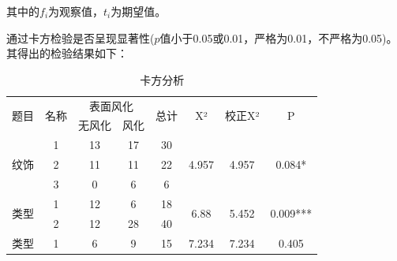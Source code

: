 \documentclass[UTF8]{ctexart}
\begin{document}
                其中的$f_i$为观察值，$t_i$为期望值。

                通过卡方检验是否呈现显著性($p$值小于0.05或0.01，严格为0.01，不严格为0.05)。其得出的检验结果如下：

                \begin{table}[H]
                    \centering
                    \caption{卡方分析}%
                    \begin{tabular}{|c|c|c|c|c|c|c|c|} \hline
                        \multirow{2}{*}{题目} & \multirow{2}{*}{名称} & \multicolumn{2}{|c|}{表面风化} & \multirow{2}{*}{总计} & \multirow{2}{*}{X²} & \multirow{2}{*}{校正X²} & \multirow{2}{*}{P}                                 \\ \cline{3-4}
                                              &                       & 无风化                         & 风化                  &                     &                         &                        &                           \\ \hline
                        \multirow{3}{*}{纹饰} & 1                     & 13                             & 17                    & 30                  & \multirow{3}{*}{4.957}  & \multirow{3}{*}{4.957} & \multirow{3}{*}{0.084*}   \\ \cline{2-5}
                                              & 2                     & 11                             & 11                    & 22                  & ~                       & ~                      & ~                         \\ \cline{2-5}
                                              & 3                     & 0                              & 6                     & 6                   & ~                       & ~                      & ~                         \\ \hline
                        \multirow{2}{*}{类型} & 1                     & 12                             & 6                     & 18                  & \multirow{2}{*}{6.88}   & \multirow{2}{*}{5.452} & \multirow{2}{*}{0.009***} \\ \cline{2-5}
                        ~                     & 2                     & 12                             & 28                    & 40                  & ~                       & ~                      & ~                         \\ \hline
                        \multirow{8}{*}{类型} & 1                     & 6                              & 9                     & 15                  & \multirow{8}{*}{7.234}  & \multirow{8}{*}{7.234} & \multirow{8}{*}{0.405}    \\ \cline{2-5}

\end{tabular}
\end{table}
\end{document}
